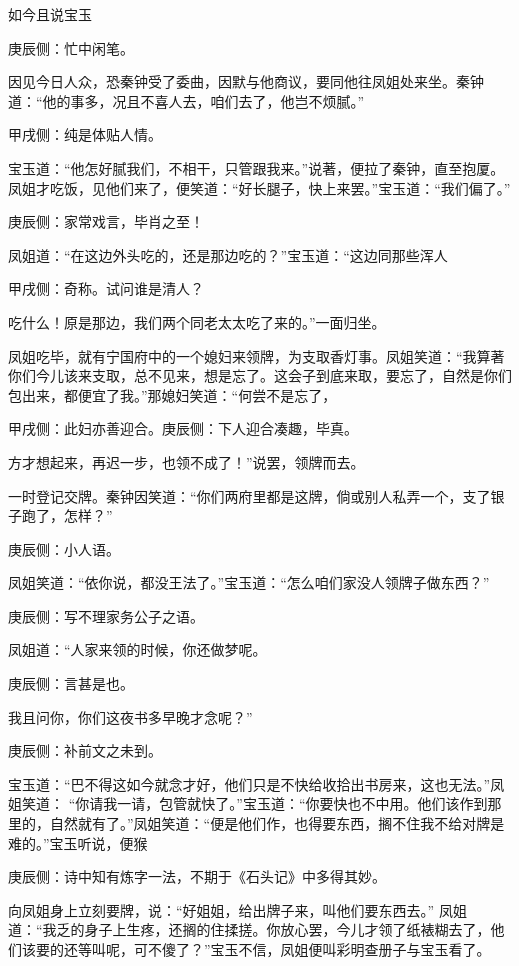 \begin{parag}
    如今且说宝玉\begin{note}庚辰侧：忙中闲笔。\end{note}因见今日人众，恐秦钟受了委曲，因默与他商议，要同他往凤姐处来坐。秦钟道：“他的事多，况且不喜人去，咱们去了，他岂不烦腻。”\begin{note}甲戌侧：纯是体贴人情。\end{note}宝玉道：“他怎好腻我们，不相干，只管跟我来。”说著，便拉了秦钟，直至抱厦。凤姐才吃饭，见他们来了，便笑道：“好长腿子，快上来罢。”宝玉道：“我们偏了。”\begin{note}庚辰侧：家常戏言，毕肖之至！\end{note}凤姐道：“在这边外头吃的，还是那边吃的？”宝玉道：“这边同那些浑人\begin{note}甲戌侧：奇称。试问谁是清人？\end{note}吃什么！原是那边，我们两个同老太太吃了来的。”一面归坐。
\end{parag}


\begin{parag}
    凤姐吃毕，就有宁国府中的一个媳妇来领牌，为支取香灯事。凤姐笑道：“我算著你们今儿该来支取，总不见来，想是忘了。这会子到底来取，要忘了，自然是你们包出来，都便宜了我。”那媳妇笑道：“何尝不是忘了，\begin{note}甲戌侧：此妇亦善迎合。庚辰侧：下人迎合凑趣，毕真。\end{note}方才想起来，再迟一步，也领不成了！”说罢，领牌而去。
\end{parag}


\begin{parag}
    一时登记交牌。秦钟因笑道：“你们两府里都是这牌，倘或别人私弄一个，支了银子跑了，怎样？”\begin{note}庚辰侧：小人语。\end{note}凤姐笑道：“依你说，都没王法了。”宝玉道：“怎么咱们家没人领牌子做东西？”\begin{note}庚辰侧：写不理家务公子之语。\end{note}凤姐道：“人家来领的时候，你还做梦呢。\begin{note}庚辰侧：言甚是也。\end{note}我且问你，你们这夜书多早晚才念呢？”\begin{note}庚辰侧：补前文之未到。\end{note}宝玉道：“巴不得这如今就念才好，他们只是不快给收拾出书房来，这也无法。”凤姐笑道： “你请我一请，包管就快了。”宝玉道：“你要快也不中用。他们该作到那里的，自然就有了。”凤姐笑道：“便是他们作，也得要东西，搁不住我不给对牌是难的。”宝玉听说，便猴\begin{note}庚辰侧：诗中知有炼字一法，不期于《石头记》中多得其妙。\end{note}向凤姐身上立刻要牌，说：“好姐姐，给出牌子来，叫他们要东西去。” 凤姐道：“我乏的身子上生疼，还搁的住揉搓。你放心罢，今儿才领了纸裱糊去了，他们该要的还等叫呢，可不傻了？”宝玉不信，凤姐便叫彩明查册子与宝玉看了。
\end{parag}


